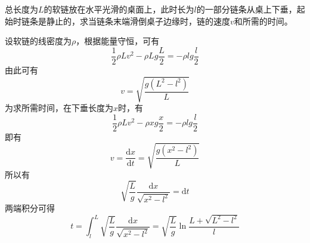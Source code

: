 \begin{question}[31页1.23]
总长度为$L$的软链放在水平光滑的桌面上，此时长为$l$的一部分链条从桌上下垂，起始时链条是静止的，求当链条末端滑倒桌子边缘时，链的速度$v$和所需的时间。
\end{question}
\begin{solution}
设软链的线密度为$\rho$，根据能量守恒，可有
\begin{equation*}
	\frac12 \rho L v^2 - \rho L g \frac{L}{2} = -\rho l g \frac{l}{2}
\end{equation*}
由此可有
\begin{equation*}
	v = \sqrt{\frac{g(L^2-l^2)}{L}}
\end{equation*}
为求所需时间，在下垂长度为$x$时，有
\begin{equation*}
	\frac12 \rho L v^2 - \rho x g \frac{x}{2} = -\rho l g \frac{l}{2}
\end{equation*}
即有
\begin{equation*}
	v = \frac{\mathrm{d} x}{\mathrm{d} t} = \sqrt{\frac{g(x^2-l^2)}{L}}
\end{equation*}
所以有
\begin{equation*}
	\sqrt{\frac{L}{g}} \frac{\mathrm{d} x}{\sqrt{x^2-l^2}} = \mathrm{d} t
\end{equation*}
两端积分可得
\begin{equation*}
	t = \int_l^L \sqrt{\frac{L}{g}} \frac{\mathrm{d} x}{\sqrt{x^2-l^2}} = \sqrt{\frac{L}{g}} \ln \frac{L+\sqrt{L^2-l^2}}{l}
\end{equation*}
\end{solution}

